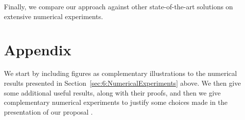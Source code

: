 %
Finally, we compare our approach against other state-of-the-art solutions on extensive numerical experiments.




\minitoc

\newpage










\newpage
\section{Appendix}
\label{sec:6:appendix}

We start by including figures as complementary illustrations to the numerical results presented in Section~\ref{sec:6:NumericalExperiments} above.
We then give some additional useful results, along with their proofs, and then we give complementary numerical experiments to justify some choices made in the presentation of our proposal \GLRklUCB.


